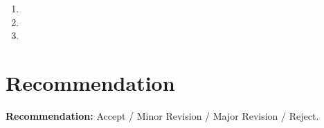 \documentclass[12pt]{article}
\begin{document}
\begin{enumerate}
    \item
    \item
    \item
\end{enumerate}

\section*{Recommendation}

\textbf{Recommendation:} Accept / Minor Revision / Major Revision / Reject.



\end{document}
